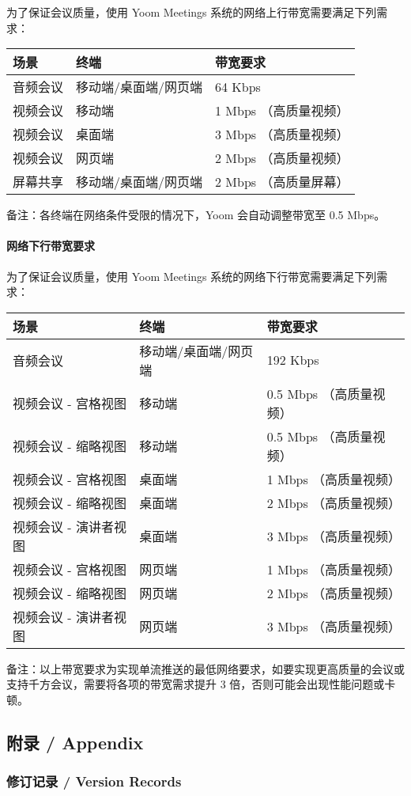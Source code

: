 \documentclass[]{ctexart}
\let\oldparagraph\paragraph
\renewcommand{\paragraph}[1]{\oldparagraph{#1}\mbox{}}
\begin{document}
为了保证会议质量，使用 Yoom Meetings
系统的网络上行带宽需要满足下列需求：

\begin{longtable}[]{@{}lll@{}}
\toprule
场景 & 终端 & 带宽要求\tabularnewline
\midrule
\endhead
音频会议 & 移动端/桌面端/网页端 & 64 Kbps\tabularnewline
视频会议 & 移动端 & 1 Mbps （高质量视频）\tabularnewline
视频会议 & 桌面端 & 3 Mbps （高质量视频）\tabularnewline
视频会议 & 网页端 & 2 Mbps （高质量视频）\tabularnewline
屏幕共享 & 移动端/桌面端/网页端 & 2 Mbps （高质量屏幕）\tabularnewline
\bottomrule
\end{longtable}

备注：各终端在网络条件受限的情况下，Yoom 会自动调整带宽至 0.5 Mbps。

\hypertarget{ux7f51ux7edcux4e0bux884cux5e26ux5bbdux8981ux6c42}{%
\paragraph{网络下行带宽要求}\label{ux7f51ux7edcux4e0bux884cux5e26ux5bbdux8981ux6c42}}

为了保证会议质量，使用 Yoom Meetings
系统的网络下行带宽需要满足下列需求：

\begin{longtable}[]{@{}lll@{}}
\toprule
场景 & 终端 & 带宽要求\tabularnewline
\midrule
\endhead
音频会议 & 移动端/桌面端/网页端 & 192 Kbps\tabularnewline
视频会议 - 宫格视图 & 移动端 & 0.5 Mbps （高质量视频）\tabularnewline
视频会议 - 缩略视图 & 移动端 & 0.5 Mbps （高质量视频）\tabularnewline
视频会议 - 宫格视图 & 桌面端 & 1 Mbps （高质量视频）\tabularnewline
视频会议 - 缩略视图 & 桌面端 & 2 Mbps （高质量视频）\tabularnewline
视频会议 - 演讲者视图 & 桌面端 & 3 Mbps （高质量视频）\tabularnewline
视频会议 - 宫格视图 & 网页端 & 1 Mbps （高质量视频）\tabularnewline
视频会议 - 缩略视图 & 网页端 & 2 Mbps （高质量视频）\tabularnewline
视频会议 - 演讲者视图 & 网页端 & 3 Mbps （高质量视频）\tabularnewline
\bottomrule
\end{longtable}

备注：以上带宽要求为实现单流推送的最低网络要求，如要实现更高质量的会议或支持千方会议，需要将各项的带宽需求提升
3 倍，否则可能会出现性能问题或卡顿。


\hypertarget{ux9644ux5f55--appendix}{%
\subsection{附录 / Appendix}\label{ux9644ux5f55--appendix}}

\hypertarget{ux4feeux8ba2ux8bb0ux5f55--version-records}{%
\subsubsection{修订记录 / Version
Records}\label{ux4feeux8ba2ux8bb0ux5f55--version-records}}
\end{document}
